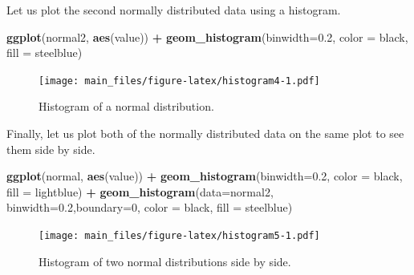 \documentclass[
]{book}
\newenvironment{Shaded}{\begin{snugshade}}{\end{snugshade}}
\newcommand{\AttributeTok}[1]{\textcolor[rgb]{0.13,0.29,0.53}{#1}}
\newcommand{\DecValTok}[1]{\textcolor[rgb]{0.00,0.00,0.81}{#1}}
\newcommand{\FloatTok}[1]{\textcolor[rgb]{0.00,0.00,0.81}{#1}}
\newcommand{\FunctionTok}[1]{\textcolor[rgb]{0.13,0.29,0.53}{\textbf{#1}}}
\newcommand{\NormalTok}[1]{#1}
\newcommand{\SpecialCharTok}[1]{\textcolor[rgb]{0.81,0.36,0.00}{\textbf{#1}}}
\newcommand{\StringTok}[1]{\textcolor[rgb]{0.31,0.60,0.02}{#1}}
\begin{document}
Let us plot the second normally distributed data using a histogram.

\begin{Shaded}
\begin{Highlighting}[]
\FunctionTok{ggplot}\NormalTok{(normal2, }\FunctionTok{aes}\NormalTok{(value)) }\SpecialCharTok{+}
        \FunctionTok{geom\_histogram}\NormalTok{(}\AttributeTok{binwidth=}\FloatTok{0.2}\NormalTok{,}
                       \AttributeTok{color =} \StringTok{\textquotesingle{}black\textquotesingle{}}\NormalTok{,}
                       \AttributeTok{fill =} \StringTok{\textquotesingle{}steelblue\textquotesingle{}}\NormalTok{)}
\end{Highlighting}
\end{Shaded}

\begin{figure}
\centering
\texttt{[image: main\_files/figure-latex/histogram4-1.pdf]}
\caption{\label{fig:histogram4}Histogram of a normal distribution.}
\end{figure}

Finally, let us plot both of the normally distributed data on the same plot to see them side by side.

\begin{Shaded}
\begin{Highlighting}[]
\FunctionTok{ggplot}\NormalTok{(normal, }\FunctionTok{aes}\NormalTok{(value)) }\SpecialCharTok{+}
        \FunctionTok{geom\_histogram}\NormalTok{(}\AttributeTok{binwidth=}\FloatTok{0.2}\NormalTok{,}
                       \AttributeTok{color =} \StringTok{\textquotesingle{}black\textquotesingle{}}\NormalTok{,}
                       \AttributeTok{fill =} \StringTok{\textquotesingle{}lightblue\textquotesingle{}}\NormalTok{) }\SpecialCharTok{+}
          \FunctionTok{geom\_histogram}\NormalTok{(}\AttributeTok{data=}\NormalTok{normal2, }\AttributeTok{binwidth=}\FloatTok{0.2}\NormalTok{,}\AttributeTok{boundary=}\DecValTok{0}\NormalTok{,}
                       \AttributeTok{color =} \StringTok{\textquotesingle{}black\textquotesingle{}}\NormalTok{,}
                       \AttributeTok{fill =} \StringTok{\textquotesingle{}steelblue\textquotesingle{}}\NormalTok{)}
\end{Highlighting}
\end{Shaded}

\begin{figure}
\centering
\texttt{[image: main\_files/figure-latex/histogram5-1.pdf]}
\caption{\label{fig:histogram5}Histogram of two normal distributions side by side.}
\end{figure}
\end{document}

